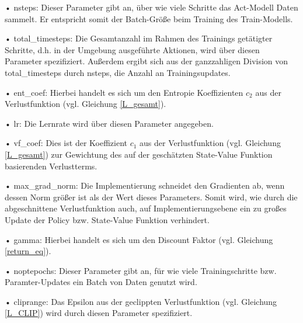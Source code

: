 \begin{description}
	\item • nsteps: Dieser Parameter gibt an, über wie viele Schritte das Act-Modell Daten sammelt. Er entspricht somit der Batch-Größe beim Training des Train-Modells.
	\item • total\_timesteps: Die Gesamtanzahl im Rahmen des Trainings getätigter Schritte, d.h. in der Umgebung ausgeführte Aktionen, wird über diesen Parameter spezifiziert. Außerdem ergibt sich aus der ganzzahligen Division von total\_timesteps durch nsteps, die Anzahl an Trainingsupdates.
	\item • ent\_coef: Hierbei handelt es sich um den Entropie Koeffizienten $c_2$ aus der Verlustfunktion (vgl. Gleichung \eqref{L_gesamt}).
	\item • lr: Die Lernrate wird über diesen Parameter angegeben.
	\item • vf\_coef: Dies ist der Koeffizient $c_1$ aus der Verlustfunktion (vgl. Gleichung \eqref{L_gesamt}) zur Gewichtung des auf der geschätzten State-Value Funktion basierenden Verlustterms.
	\item • max\_grad\_norm: Die Implementierung schneidet den Gradienten ab, wenn dessen Norm größer ist als der Wert dieses Parameters. Somit wird, wie durch die abgeschnittene Verlustfunktion auch, auf Implementierungsebene ein zu großes Update der Policy bzw. State-Value Funktion verhindert.
	\item • gamma: Hierbei handelt es sich um den Discount Faktor (vgl. Gleichung \eqref{return_eq}).
	\item • noptepochs: Dieser Parameter gibt an, für wie viele Trainingschritte bzw. Paramter-Updates ein Batch von Daten genutzt wird.
	\item • cliprange: Das Epsilon aus der  geclippten Verlustfunktion (vgl. Gleichung \eqref{L_CLIP}) wird durch diesen Parameter spezifiziert.
\end{description}

